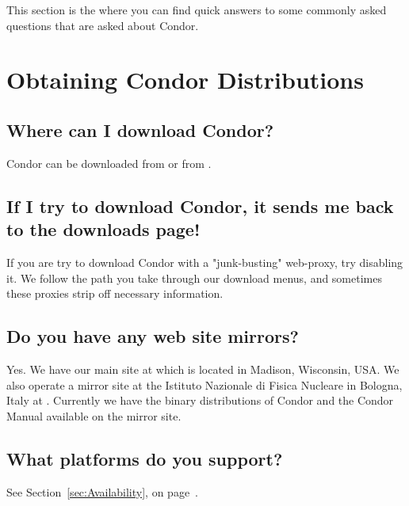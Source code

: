 This section is the where you can find quick answers to some commonly
asked questions that are asked about Condor.

\section{Obtaining Condor Distributions}

\subsection{Where can I download Condor?}
Condor can be downloaded from  or from
.

\subsection{If I try to download Condor, it sends me back to the downloads page!}

If you are try to download Condor with a "junk-busting" web-proxy, try disabling it.
We follow the path you take through our download menus, and sometimes these proxies strip off necessary information.

\subsection{Do you have any web site mirrors?}

Yes.  We have our main site at 
which is located in Madison, Wisconsin, USA.  We also operate a mirror
site at the Istituto Nazionale di Fisica Nucleare in Bologna, Italy
at .  Currently we have the 
binary distributions of Condor and the Condor Manual available on the
mirror site.


\subsection{What platforms do you support?}

See Section~\ref{sec:Availability}, on page~\pageref{sec:Availability}.

